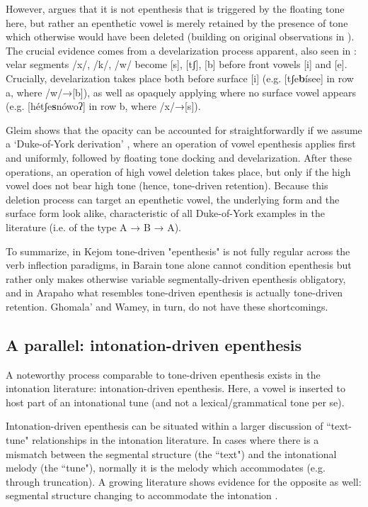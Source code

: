 \documentclass[output=paper,colorlinks,citecolor=brown,draft,draftmode]{langscibook}
\begin{document}
However,  \citet{gleim2019} argues that it is not epenthesis that is triggered by the floating tone here, but rather an epenthetic vowel is merely retained by the presence of tone which otherwise would have been deleted (building on original observations in \citealt[16]{Cowell2008}). 
The crucial evidence comes from a develarization process apparent, also seen in :
velar segments /x/, /k/, \mbox{/w/} become [s], [tʃ], [b] before front vowels [i] and [e].
Crucially, develarization  takes place both before surface [i] (e.g. [tʃe\textbf{b}ísee]
in row a, where /w/→[b]),
as well as opaquely applying where no surface vowel appears (e.g. [hétʃe\textbf{s}nówoʔ] 
in row b, where /x/→[s]).

Gleim shows that the opacity can be accounted for straightforwardly if we assume  a `Duke-of-York derivation' \citep{pullum1976}, where an operation of vowel epenthesis applies first and uniformly,
followed by floating tone docking and develarization.
After these operations, an operation of high vowel deletion takes place, but only if the high vowel does not bear high tone (hence, tone-driven retention).
Because this deletion process can target an epenthetic vowel, the underlying form and the surface form look alike, characteristic of all Duke-of-York examples in the literature (i.e. of the type A → B → A). 

To summarize, 
in Kejom tone-driven "epenthesis" is not fully regular across the verb inflection paradigms, 
in Barain   tone alone cannot condition epenthesis but rather only makes otherwise variable segmentally-driven epenthesis obligatory,
and in Arapaho what resembles tone-driven epenthesis is actually tone-driven retention.
Ghomala' and Wamey, in turn, do not have  these shortcomings.
 
\subsection{A parallel: intonation-driven epenthesis}\label{sec:intonation}
A noteworthy  process comparable to tone-driven epenthesis exists in the intonation literature: intonation-driven epenthesis.
Here, a vowel is inserted to host part of an intonational tune (and not a lexical/grammatical tone per se).

Intonation-driven epenthesis can be situated within a larger discussion of ``text-tune" relationships in the intonation literature.
In cases where there is a mismatch between the segmental structure (the ``text") and the intonational melody (the ``tune"), normally it is the melody which accommodates (e.g. through truncation). 
A growing literature shows evidence for the opposite as well: segmental structure changing to accommodate the intonation 
\citep{roettger_tonal_2017,grice_word_2018,roettger2019}.
\end{document}
